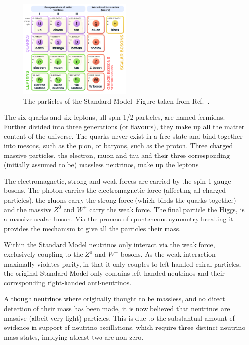 \begin{figure} %
    \includegraphics[origin=c,width=0.5\textwidth]{diagrams/3-theory/sm.png}
    \caption[The Standard Model particles]
    {The particles of the Standard Model. Figure taken from Ref.~\cite{wiki2020}.}
    \label{fig:sm}
\end{figure} %

The six quarks and six leptons, all spin 1/2 particles, are named fermions. Further divided into
three generations (or flavours), they make up all the matter content of the universe. The quarks
never exist in a free state and bind together into mesons, such as the pion, or baryons, such as
the proton. Three charged massive particles, the electron, muon and tau and their three
corresponding (initially assumed to be) massless neutrinos, make up the leptons.

The electromagnetic, strong and weak forces are carried by the spin 1 gauge bosons. The photon
carries the electromagnetic force (affecting all charged particles), the gluons carry the strong
force (which binds the quarks together) and the massive $Z^{0}$ and $W^{\pm}$ carry the weak
force. The final particle the Higgs, is a massive scalar boson. Via the process of sponteneous
symmetry breaking it provides the mechanism to give all the particles their mass.

Within the Standard Model neutrinos only interact via the weak force, exclusively coupling to the
$Z^{0}$ and $W^{\pm}$ bosons. As the weak interaction maximally violates parity, in that it only
couples to left-handed chiral particles, the original Standard Model only contains left-handed
neutrinos and their corresponding right-handed anti-neutrinos.

Although neutrinos where originally thought to be massless, and no direct detection of their mass
has been made, it is now believed that neutrinos are massive (albeit very light) particles. This
is due to the substantual amount of evidence in support of neutrino oscillations, which require
three distinct neutrino mass states, implying atleast two are non-zero.

